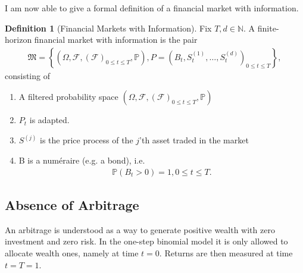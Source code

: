 \documentclass{article}
\theoremstyle{definition}
\newtheorem{definition}[theorem]{Definition}
\numberwithin{equation}{section}
\begin{document}
I am now able to give a formal definition of a financial market with information.
\begin{definition}[Financial Markets with Information]
    Fix $T, d \in \mathbb{N}$.
    A finite-horizon financial market with information is the pair
    \begin{align}
        \mathfrak{M} =
        \left\{
            \left(
                \Omega, 
                \mathscr{F}, 
                \left(
                    \mathscr{F}
                \right)_{0 \leq t \leq T},
                \mathbb{P}
            \right),
            P =
            \left(
                B_t,
                S_t^{(1)},
                \ldots,
                S_t^{(d)}
            \right)_{0 \leq t \leq T}
        \right\},
    \end{align}
    consisting of
    \begin{enumerate}
        \item A filtered probability space 
        $\left(
            \Omega, 
            \mathscr{F}, 
            \left(
                \mathscr{F}
            \right)_{0 \leq t \leq T},
            \mathbb{P}
        \right)$
        \item $P_t$ is adapted.
        \item $S^{(j)}$ is the price process of the $j$'th asset traded in the market
        \item B is a numéraire (e.g. a bond), i.e.
        \begin{align}
            \mathbb{P}(B_t > 0) = 1, 0 \leq t \leq T.
        \end{align}
    \end{enumerate}
\end{definition}

\subsection{Absence of Arbitrage}
An arbitrage is understood as a way to generate positive wealth with zero investment and zero risk.
In the one-step binomial model it is only allowed to allocate wealth ones, namely at time $t = 0$.
Returns are then measured at time $t = T = 1$.
\end{document}
